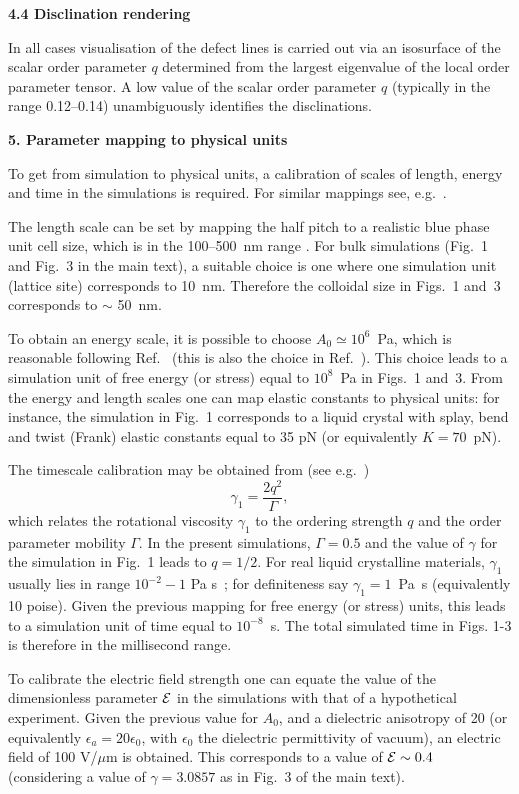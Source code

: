 \documentclass[12pt,twoside]{article}
\begin{document}
{\bf 4.4 Disclination rendering}

In all cases visualisation of the defect lines is carried out via
an isosurface of the scalar order parameter $q$ determined from the
largest eigenvalue of the local order parameter tensor. A low value
of the scalar order parameter $q$ (typically in the range 0.12--0.14)
unambiguously identifies the disclinations.

{\bf 5. Parameter mapping to physical units}

To get from simulation to physical units, a calibration of scales of
length, energy and time in the simulations is required. For similar
mappings see,
e.g.~\cite{denniston2}.

The length scale can be set by mapping the half pitch to a realistic blue
phase unit cell size, which is in the 100--500~nm range \cite{blue1}. 
For bulk simulations (Fig.~1 and Fig.~3 in the main text), a suitable choice
is one where one simulation unit (lattice site) corresponds to 10~nm. Therefore
the colloidal size in Figs.~1 and~3 corresponds to $\sim$ 50~nm. 

To obtain an energy scale, it is possible to choose $A_0 \simeq 10^6$~Pa,
which is reasonable following Ref.~\cite{blue1} (this is also the choice in
Ref.~\cite{oliver2}). This choice leads to a simulation unit of
free energy (or stress) equal to $10^{8}$~Pa in Figs.~1 and~3.
From the energy and length scales one can map elastic constants to
physical units: for instance, the simulation in Fig.~1 corresponds to
a liquid crystal with splay, bend and twist (Frank) elastic constants
equal to 35 pN (or equivalently $K=70$~pN).

The timescale calibration may be obtained from (see e.g.~\cite{denniston})
\begin{equation}
\gamma_1=\frac{2q^2}{\Gamma},
\end{equation}
which relates the rotational viscosity $\gamma_1$ to the ordering strength
$q$ and the order parameter mobility $\Gamma$.
In the present simulations, $\Gamma = 0.5$ and the value of $\gamma$
for the simulation in Fig.~1 leads to $q=1/2$.   
For real liquid crystalline materials, $\gamma_1$ usually lies in range
$10^{-2}-1$ Pa s~\cite{deGennes}; for definiteness say
$\gamma_1 = 1$~Pa~s (equivalently 10 poise). Given the previous mapping for
free energy (or stress) units, this leads to a simulation unit of time equal
to $10^{-8}$~s. The total simulated time in Figs. 1-3 is therefore in the
millisecond range. 

To calibrate the electric field strength 
one can equate the value of the dimensionless parameter ${\cal E}$ in the 
simulations with that of a hypothetical experiment.
Given the previous value for $A_0$, and a dielectric anisotropy of 20
(or equivalently $\epsilon_a=20\epsilon_0$, with $\epsilon_0$ the
dielectric permittivity of vacuum), an electric field
of 100 V/$\mu$m is obtained. This corresponds to a value of
${\cal E}\sim 0.4$ (considering a value of $\gamma=3.0857$ as in
Fig.~3 of the main text).
\end{document}
